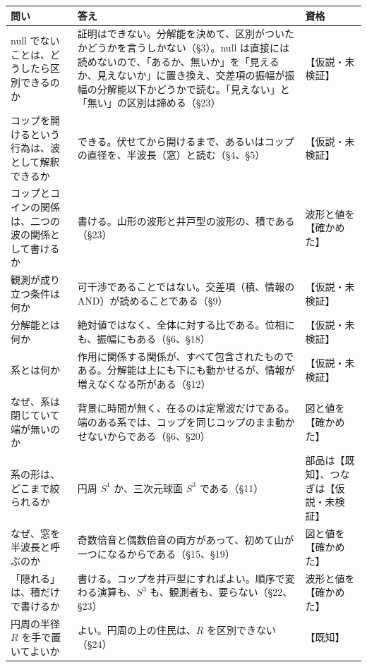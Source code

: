\documentclass[
  a4paper,
]{ltjsarticle}
\newcounter{none} %
\begin{document}
{\def\LTcaptype{none} %
\begin{longtable}[]{@{}
  >{\raggedright\arraybackslash}p{}
  >{\raggedright\arraybackslash}p{}
  >{\raggedright\arraybackslash}p{}@{}}
\toprule\noalign{}
\begin{minipage}[b]{\linewidth}\raggedright
問い
\end{minipage} & \begin{minipage}[b]{\linewidth}\raggedright
答え
\end{minipage} & \begin{minipage}[b]{\linewidth}\raggedright
資格
\end{minipage} \\
\midrule\noalign{}
\endhead
\bottomrule\noalign{}
\endlastfoot
null でないことは、どうしたら区別できるのか &
証明はできない。分解能を決めて、区別がついたかどうかを言うしかない（§3）。null
は直接には読めないので、「あるか、無いか」を「見えるか、見えないか」に置き換え、交差項の振幅が振幅の分解能以下かどうかで読む。「見えない」と「無い」の区別は諦める（§23）
& 【仮説・未検証】 \\
コップを開けるという行為は、波として解釈できるか &
できる。伏せてから開けるまで、あるいはコップの直径を、半波長（窓）と読む（§4、§5）
& 【仮説・未検証】 \\
コップとコインの関係は、二つの波の関係として書けるか &
書ける。山形の波形と井戸型の波形の、積である（§23） &
波形と値を【確かめた】 \\
観測が成り立つ条件は何か & 可干渉であることではない。交差項（積、情報の
AND）が読めることである（§9） & 【仮説・未検証】 \\
分解能とは何か &
絶対値ではなく、全体に対する比である。位相にも、振幅にもある（§6、§18）
& 【仮説・未検証】 \\
系とは何か &
作用に関係する関係が、すべて包含されたものである。分解能は上にも下にも動かせるが、情報が増えなくなる所がある（§12）
& 【仮説・未検証】 \\
なぜ、系は閉じていて端が無いのか &
背景に時間が無く、在るのは定常波だけである。端のある系では、コップを同じコップのまま動かせないからである（§6、§20）
& 図と値を【確かめた】 \\
系の形は、どこまで絞られるか & 円周 \(S^1\) か、三次元球面 \(S^3\)
である（§11） & 部品は【既知】、つなぎは【仮説・未検証】 \\
なぜ、窓を半波長と呼ぶのか &
奇数倍音と偶数倍音の両方があって、初めて山が一つになるからである（§15、§19）
& 図と値を【確かめた】 \\
「隠れる」は、積だけで書けるか &
書ける。コップを井戸型にすればよい。順序で変わる演算も、\(S^3\)
も、観測者も、要らない（§22、§23） & 波形と値を【確かめた】 \\
円周の半径 \(R\) を手で置いてよいか & よい。円周の上の住民は、\(R\)
を区別できない（§24） & 【既知】 \\
\end{longtable}
}
\end{document}
